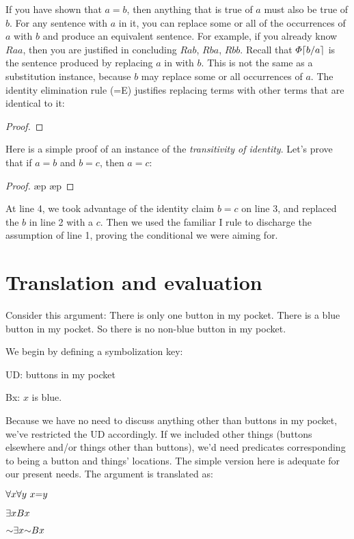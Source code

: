 If you have shown that $a{=}b$, then anything that is true of $a$ must also be true of $b$. For any sentence with $a$ in it, you can replace some or all of the occurrences of $a$ with $b$ and produce an equivalent sentence. For example, if you already know $Raa$, then you are justified in concluding $Rab$, $Rba$, $Rbb$. Recall that $\metaA{}\substitutesome{a}{b}$ is the sentence produced by replacing $a$ in \metaA{} with $b$. This is not the same as a substitution instance, because $b$ may replace some or all occurrences of $a$. The identity elimination rule ({=}E) justifies replacing terms with other terms that are identical to it:
\begin{proof}
	 
	 
\end{proof}

Here is a simple proof of an instance of the \emph{transitivity of identity}. Let's prove that if $a{=}b$ and $b{=}c$, then $a{=}c$:

\begin{proof}
	\open
		\ae{p}
		\ae{p}
	\close
	 
\end{proof}

At line 4, we took advantage of the identity claim $b{=}c$ on line 3, and replaced the $b$ in line 2 with a $c$. Then we used the familiar \eif{}I rule to discharge the assumption of line 1, proving the conditional we were aiming for.


\section{Translation and evaluation}

Consider this argument: There is only one button in my pocket. There is a blue button in my pocket. So there is no non-blue button in my pocket.

We begin by defining a symbolization key:
\begin{ekey}
\item{UD:} buttons in my pocket
\item{Bx:} $x$ is blue.
\end{ekey}
Because we have no need to discuss anything other than buttons in my pocket, we've restricted the UD accordingly. If we included other things (buttons elsewhere and/or things other than buttons), we'd need predicates corresponding to being a button and things' locations. The simple version here is adequate for our present needs. The argument is translated as:
\begin{earg}
\item{} $\qt{\forall}{x} \qt{\forall}{y}\ x{=}y$
\item{} $\qt{\exists}{x} Bx$
\item{\therefore} $\enot \qt{\exists}{x} \enot Bx$
\end{earg}

